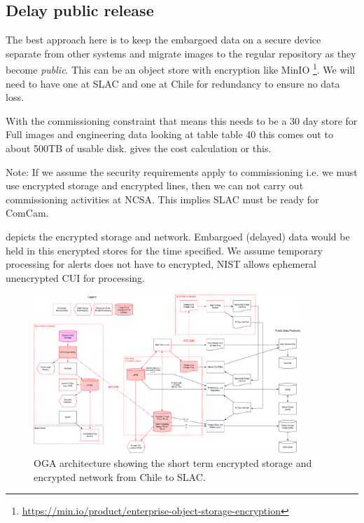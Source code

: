 
\subsection{Delay public release} \label{sec:3delay}

The best approach here is to keep the embargoed data on a secure device separate from other systems and migrate images to the regular repository as they become \emph{public}.
This can be an object store with encryption like MinIO \footnote{\url{ https://min.io/product/enterprise-object-storage-encryption}}.
We will need to have one at SLAC and one at Chile for redundancy to ensure no data loss.

With the commissioning constraint that means this needs to be a 30 day store  for Full images and engineering data looking at 
table table 40 this comes out to about 500TB of usable disk.
 gives the cost calculation or this.




{\bfi Note:} If we assume the security requirements apply to commissioning i.e. we must use encrypted storage and encrypted lines, then we can not carry out commissioning activities at NCSA. This implies SLAC must be ready for ComCam.

 depicts the encrypted storage and network. Embargoed (delayed) data would be held in this encrypted stores for the time specified.
We assume temporary processing for alerts does not have to encrypted, NIST allows ephemeral unencrypted CUI for processing.

\begin{figure}
\begin{centering}
\includegraphics[width=0.9\textwidth]{OGA_Diagram}
	\caption{ OGA architecture  showing the short term encrypted storage and encrypted network from Chile to SLAC. \label{fig:arch}}
\end{centering}
\end{figure}
